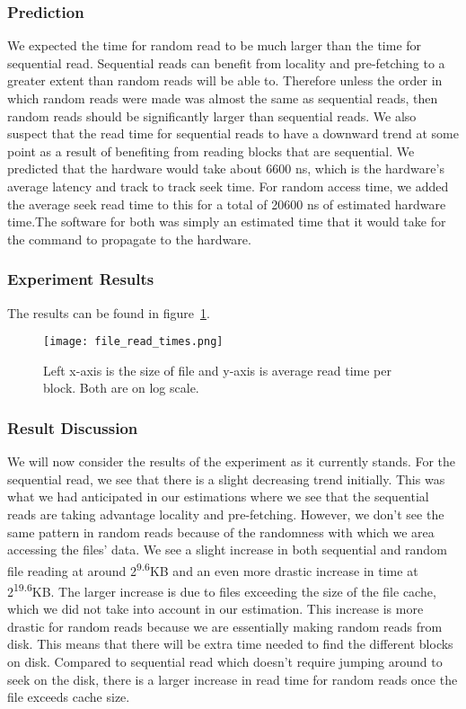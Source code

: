 \documentclass{article} %
\begin{document}
\subsubsection{Prediction}
We expected the time for random read to be much larger than the time for sequential read. Sequential reads can benefit from locality and pre-fetching to a greater extent than random reads will be able to. Therefore unless the order in which random reads were made was almost the same as sequential reads, then random reads should be significantly larger than sequential reads. We also suspect that the read time for sequential reads to have a downward trend at some point as a result of benefiting from reading blocks that are sequential. We predicted that the hardware would take about 6600 ns, which is the hardware's average latency and track to track seek time. For random access time, we added the average seek read time to this for a total of 20600 ns of estimated hardware time.The software for both was simply an estimated time that it would take for the command to propagate to the hardware.

\subsubsection{Experiment Results}

The results can be found in figure~\ref{fig:file_read_times}.

\begin{figure}[!htb]
  \centering
  \texttt{[image: file\_read\_times.png]}
  \caption{Left x-axis is the size of file and y-axis is average read time per block. Both are on log scale.}
  \label{fig:file_read_times}
\end{figure}


\subsubsection{Result Discussion}
We will now consider the results of the experiment as it currently stands. For
the sequential read, we see that there is a slight decreasing trend initially.
This was what we had anticipated in our estimations where we see that the
sequential reads are taking advantage locality and pre-fetching. However, we
don't see the same pattern in random reads because of the randomness with which
we area accessing the files' data. We see a slight increase in both sequential
and random file reading at around 2\textsuperscript{9.6}KB and an even more
drastic increase in time at 2\textsuperscript{19.6}KB\@. The larger increase is
due to files exceeding the size of the file cache, which we did not take into
account in our estimation. This increase is more drastic for random reads
because we are essentially making random reads from disk. This means that there
will be extra time needed to find the different blocks on disk. Compared to
sequential read which doesn't require jumping around to seek on the disk, there
is a larger increase in read time for random reads once the file exceeds cache
size.
\end{document}
